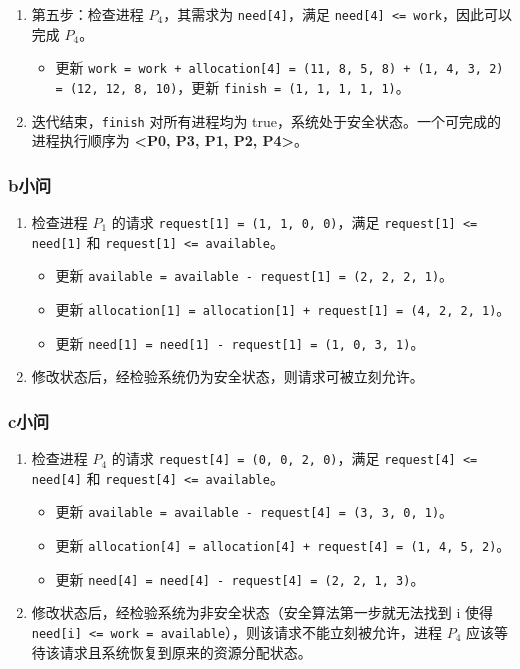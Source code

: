 \documentclass{article}
\begin{document}
\begin{enumerate}
\begin{enumerate}
		\item 第五步：检查进程 $P_4$，其需求为 \texttt{need[4]}，满足 \texttt{need[4] <= work}，因此可以完成 $P_4$。
		\begin{itemize}
			\item 更新 \texttt{work = work + allocation[4] = (11, 8, 5, 8) + (1, 4, 3, 2) = (12, 12, 8, 10)}，更新 \texttt{finish = (1, 1, 1, 1, 1)}。
		\end{itemize}
		
		\item 
		迭代结束，\texttt{finish} 对所有进程均为 true，系统处于安全状态。一个可完成的进程执行顺序为 \textbf{<P0, P3, P1, P2, P4>}。
	\end{enumerate}
\end{enumerate}

\subsubsection{b小问}

\begin{enumerate}
	\item 检查进程 $P_1$ 的请求 \texttt{request[1] = (1, 1, 0, 0)}，满足 \texttt{request[1] <= need[1]} 和 \texttt{request[1] <= available}。
	\begin{itemize}
		\item 更新 \texttt{available = available - request[1] = (2, 2, 2, 1)}。
		\item 更新 \texttt{allocation[1] = allocation[1] + request[1] = (4, 2, 2, 1)}。
		\item 更新 \texttt{need[1] = need[1] - request[1] = (1, 0, 3, 1)}。
	\end{itemize}
	\item 修改状态后，经检验系统仍为安全状态，则请求可被立刻允许。
\end{enumerate}

\subsubsection{c小问}

\begin{enumerate}
	\item 检查进程 $P_4$ 的请求 \texttt{request[4] = (0, 0, 2, 0)}，满足 \texttt{request[4] <= need[4]} 和 \texttt{request[4] <= available}。
	\begin{itemize}
		\item 更新 \texttt{available = available - request[4] = (3, 3, 0, 1)}。
		\item 更新 \texttt{allocation[4] = allocation[4] + request[4] = (1, 4, 5, 2)}。
		\item 更新 \texttt{need[4] = need[4] - request[4] = (2, 2, 1, 3)}。
	\end{itemize}
	\item 修改状态后，经检验系统为非安全状态（安全算法第一步就无法找到 i 使得 \texttt{need[i] <= work = available}），则该请求不能立刻被允许，进程 $P_4$ 应该等待该请求且系统恢复到原来的资源分配状态。
\end{enumerate}
\end{document}

